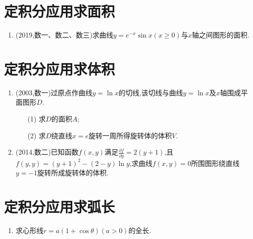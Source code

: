 \documentclass[12pt, a4paper, oneside, UTF8]{ctexbook}
\begin{document}
\section{ 定积分应用求面积}

\begin{enumerate}[label=\arabic*.,start=15]
    \item (2019,数一、数二、数三)求曲线$y=e^{-x}\sin x(x\geq 0)$与$x$轴之间图形的面积.
    
    \begin{solution}
    \newpage
    \end{solution}
\end{enumerate}

\section{ 定积分应用求体积}

\begin{enumerate}[label=\arabic*.,start=16]
    \item (2003,数一)过原点作曲线$y=\ln x$的切线,该切线与曲线$y=\ln x$及$x$轴围成平面图形$D$.
    \begin{enumerate}[label=(\roman*)]
        \item[(1)] 求$D$的面积$A$;
        \item[(2)] 求$D$绕直线$x=e$旋转一周所得旋转体的体积$V$.
    \end{enumerate}
    
    \begin{solution}
    \newpage
    \end{solution}
    
    \item (2014,数二)已知函数$f(x, y)$满足$\frac{\partial f}{\partial y}=2(y+1)$,且$f(y, y)=(y+1)^2-(2-y)\ln y$,求曲线$f(x, y)=0$所围图形绕直线$y=-1$旋转所成旋转体的体积.
    
    \begin{solution}
    \newpage
    \end{solution}
\end{enumerate}

\section{ 定积分应用求弧长}

\begin{enumerate}[label=\arabic*.,start=18]
    \item 求心形线$r=a(1+\cos\theta)(a>0)$的全长.
    
    \begin{solution}
    \newpage
    \end{solution}
\end{enumerate}
\end{document}
